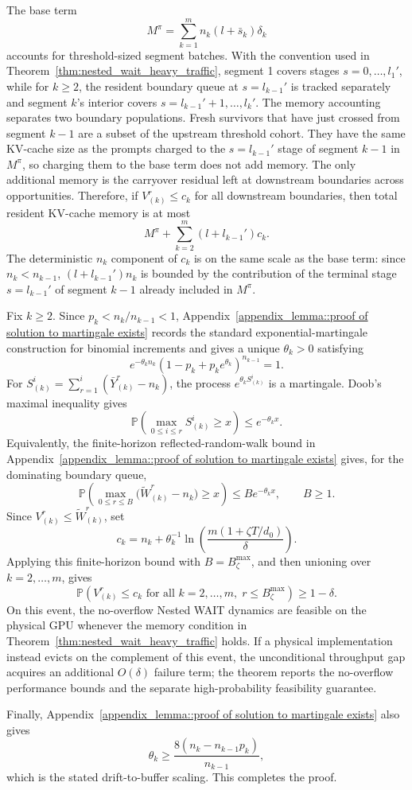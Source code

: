 The base term
\[
    M^\pi=\sum_{k=1}^m n_k(l+\bar s_k)\delta_k
\]
accounts for threshold-sized segment batches. With the convention used in Theorem~\ref{thm:nested_wait_heavy_traffic}, segment 1 covers stages \(s=0,\ldots,l_1'\), while for \(k\ge2\), the resident boundary queue at \(s=l_{k-1}'\) is tracked separately and segment \(k\)'s interior covers \(s=l_{k-1}'+1,\ldots,l_k'\). The memory accounting separates two boundary populations. Fresh survivors that have just crossed from segment \(k-1\) are a subset of the upstream threshold cohort. They have the same KV-cache size as the prompts charged to the \(s=l_{k-1}'\) stage of segment \(k-1\) in \(M^\pi\), so charging them to the base term does not add memory. The only additional memory is the carryover residual left at downstream boundaries across opportunities. Therefore, if \(V^r_{(k)}\le c_k\) for all downstream boundaries, then total resident KV-cache memory is at most
\[
    M^\pi+\sum_{k=2}^m(l+l_{k-1}')c_k .
\]
The deterministic \(n_k\) component of \(c_k\) is on the same scale as the base term: since \(n_k<n_{k-1}\), \((l+l_{k-1}')n_k\) is bounded by the contribution of the terminal stage \(s=l_{k-1}'\) of segment \(k-1\) already included in \(M^\pi\).

Fix \(k\ge2\). Since \(p_k<n_k/n_{k-1}<1\), Appendix~\ref{appendix_lemma::proof of solution to martingale exists} records the standard exponential-martingale construction for binomial increments and gives a unique \(\theta_k>0\) satisfying
\[
    e^{-\theta_k n_k}(1-p_k+p_ke^{\theta_k})^{n_{k-1}}=1.
\]
For \(S^i_{(k)}=\sum_{r=1}^i(\bar Y^r_{(k)}-n_k)\), the process \(e^{\theta_k S^i_{(k)}}\) is a martingale. Doob's maximal inequality \citep[see, e.g.,][]{durrett2019probability} gives
\[
    \mathbb{P}\!\left(\max_{0\le i\le r}S^i_{(k)}\ge x\right)\le e^{-\theta_k x}.
\]
Equivalently, the finite-horizon reflected-random-walk bound in Appendix~\ref{appendix_lemma::proof of solution to martingale exists} gives, for the dominating boundary queue,
\[
    \mathbb{P}\!\left(
    \max_{0\le r\le B}\big(\widetilde W^r_{(k)}-n_k\big)\ge x
    \right)
    \le B e^{-\theta_k x},\qquad B\ge1.
\]
Since \(V^r_{(k)}\le \widetilde W^r_{(k)}\), set
\[
    c_k
    =
    n_k+\theta_k^{-1}
    \ln\!\left(\frac{m(1+\zeta T/d_0)}{\delta}\right).
\]
Applying this finite-horizon bound with \(B=B_\zeta^{\max}\), and then unioning over \(k=2,\ldots,m\), gives
\[
    \mathbb{P}\!\left(
    V^r_{(k)}\le c_k
    \text{ for all } k=2,\ldots,m,\; r\le B_\zeta^{\max}
    \right)\ge1-\delta.
\]
On this event, the no-overflow Nested WAIT dynamics are feasible on the physical GPU whenever the memory condition in Theorem~\ref{thm:nested_wait_heavy_traffic} holds. If a physical implementation instead evicts on the complement of this event, the unconditional throughput gap acquires an additional \(O(\delta)\) failure term; the theorem reports the no-overflow performance bounds and the separate high-probability feasibility guarantee.

Finally, Appendix~\ref{appendix_lemma::proof of solution to martingale exists} also gives
\[
    \theta_k\ge \frac{8(n_k-n_{k-1}p_k)}{n_{k-1}},
\]
which is the stated drift-to-buffer scaling. This completes the proof.
